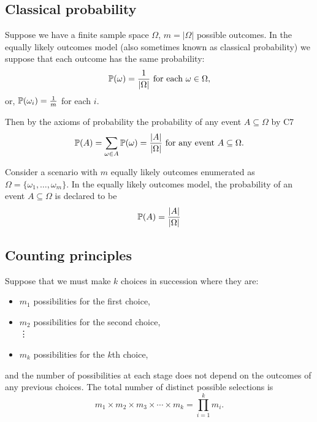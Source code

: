 \documentclass[10pt, a4paper]{article}
\begin{document}
\subsection{Classical probability}
Suppose we have a finite sample space $\Omega$, $m = |\Omega|$ possible outcomes. In the equally likely outcomes model (also sometimes known as classical probability) we suppose that each outcome has the same probability:
\[
\P(\omega) = \frac{1}{|\Omega|}\text{ for each } \omega \in \Omega,
\]
or, $\P(\omega_i) = \frac{1}{m}$ for each $i$.

Then by the axioms of probability the probability of any event $A \subseteq \Omega$ by C7
\[
\P(A) = \sum_{\omega \in A}\P(\omega) = \frac{|A|}{|\Omega|}\text{ for any event } A \subseteq \Omega.
\]

\begin{definition}
    Consider a scenario with $m$ equally likely outcomes enumerated as $\Omega = \{\omega_1,\dots,\omega_m\}$. In the equally likely outcomes model, the probability of an event $A \subseteq \Omega$ is declared to be
    \[
    \P(A) = \frac{|A|}{|\Omega|}
    \]
\end{definition}

\subsection{Counting principles}

\begin{countprinc}
    Suppose that we must make $k$ choices in succession where they are:
    \begin{itemize}
        \item $m_1$ possibilities for the first choice,
        \item $m_2$ possibilities for the second choice, \\
        \vdots
        \item $m_k$ possibilities for the $k$th choice,
    \end{itemize}
    and the number of possibilities at each stage does not depend on the outcomes of any previous choices. The total number of distinct possible selections is
    \[
    m_1 \times m_2 \times m_3 \times \dotsi \times m_k = \prod_{i = 1}^{k}m_i.
    \]
\end{countprinc}
\end{document}
